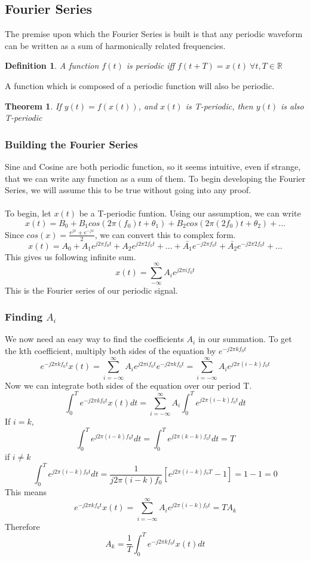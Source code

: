 \documentclass{article}
\newtheorem{theorem}{Theorem}
\newtheorem{definition}{Definition}
\begin{document}
\subsection{Fourier Series}
The premise upon which the Fourier Series is built is that any periodic waveform can be written
as a sum of harmonically related frequencies.
\begin{definition}
    A function $f(t)$ is periodic iff $f(t+T)=x(t)\ \forall t, T\in \mathbb{R}$
\end{definition}
A function which is composed of a periodic function will also be periodic.
\begin{theorem}
    If $y(t) = f(x(t))$, and $x(t)$ is T-periodic, then $y(t)$ is also T-periodic
\end{theorem}
\subsubsection{Building the Fourier Series}
Sine and Cosine are both periodic function, so it seems intuitive, even if strange,
that we can write any function as a sum of them. To begin developing the Fourier Series,
we will assume this to be true without going into any proof.\\\\
To begin, let $x(t)$ be a T-periodic funtion. Using our assumption, we can write
$$x(t) = B_0+B_1cos(2\pi(f_0)t+\theta_1)+B_2cos(2\pi(2f_0)t+\theta_2)+...$$
Since $cos(x) = \frac{e^{jx}+e^{-jx}}{2}$, we can convert this to complex form.
$$x(t) = A_0 + A_1e^{j2\pi f_0 t} + A_2e^{j2\pi 2f_0 t} + ... + \bar{A_1}e^{-j2\pi f_0 t} + \bar{A_2}e^{-j2\pi 2f_0 t} + ...$$
This gives us following infinite sum.
$$x(t) = \sum_{-\infty}^{\infty}{A_i e^{j2\pi i f_0 t}}$$
This is the Fourier series of our periodic signal.
\subsubsection{Finding $A_i$}
We now need an easy way to find the coefficients $A_i$ in our summation.
To get the kth coefficient, multiply both sides of the equation by $e^{-j2\pi k f_0t}$
$$e^{-j2\pi k f_0t} x(t) = \sum_{i=-\infty}^{\infty}{A_i e^{j2\pi i f_0 t} e^{-j2\pi k f_0t}} = \sum_{i=-\infty}^{\infty}{A_i e^{j2\pi (i-k) f_0 t}}$$
Now we can integrate both sides of the equation over our period T.
$$\int_{0}^{T}{e^{-j2\pi k f_0t} x(t)dt} = \sum_{i=-\infty}^{\infty}{A_i \int_{0}^{T}{e^{j2\pi (i-k) f_0 t}dt}}$$
If $i = k$,
$$\int_{0}^{T}{e^{j2\pi (i-k) f_0 t}dt} = \int_{0}^{T}{e^{j2\pi (k-k) f_0 t}dt} = T$$
if $i \ne k$
$$\int_{0}^{T}{e^{j2\pi (i-k) f_0 t}dt} = \frac{1}{j2\pi (i-k)f_0}\left[e^{j2\pi(i-k)f_0 T} - 1 \right] = 1 - 1 = 0$$
This means
$$e^{-j2\pi k f_0t} x(t) = \sum_{i=-\infty}^{\infty}{A_i e^{j2\pi (i-k) f_0 t}} = T A_k$$
Therefore
$$A_k = \frac{1}{T}\int_{0}^{T}{e^{-j2\pi k f_0t} x(t)dt}$$
\end{document}
